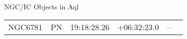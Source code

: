 \begin{block}{NGC/IC Objects in Aql}
  \centering
  \begin{tabularx}{\textwidth}{llrrll} \toprule 
    NGC6781 & PN & 19:18:28.26 & +06:32:23.0  & -- \\ 
  \end{tabularx}
\end{block}